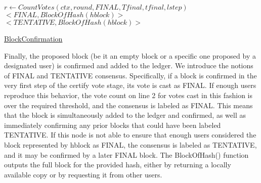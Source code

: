 \documentclass[10pt,a4paper]{article}
\begin{document}
\begin{algorithm}
    \begin{algorithmic}[1]

    \State $r \gets CountVotes(ctx, round, FINAL, Tfinal, tfinal, lstep)$
    {
        \State \Return $<FINAL, BlockOfHash(hblock)>$ 
    }
    {
        \State \Return $<TENTATIVE, BlockOfHash(hblock)>$
    }
        
    \EndFunction
    \end{algorithmic}
    \caption{\underline{BlockConfirmation}}
\end{algorithm}



Finally, the proposed block (be it an empty block or a specific one proposed by a designated user) is confirmed and added to the ledger.
We introduce the notions of FINAL and TENTATIVE consensus.
Specifically, if a block is confirmed in the very first step of the certify vote stage, its vote is cast as FINAL.
If enough users reproduce this behavior, the vote count on line 2 for votes cast in this fashion is over the required threshold, and the consensus is labeled as FINAL.
This means that the block is simultaneously added to the ledger and confirmed, as well as immediately confirming any prior blocks that could have been labeled TENTATIVE.
If this node is not able to ensure that enough users considered the block represented by hblock as FINAL, the consensus is labeled as TENTATIVE, and it may be confirmed by a later FINAL block.
The BlockOfHash() function outputs the full block for the provided hash, either by returning a locally available copy or by requesting it from other users.
\end{document}
